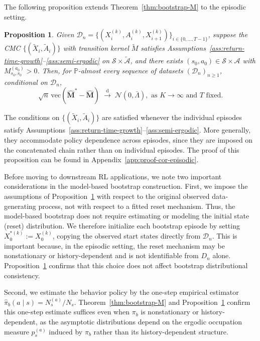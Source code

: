 \documentclass{article}
\numberwithin{equation}{section}
\newtheorem{proposition}[lemma]{Proposition}
\begin{document}
The following proposition extends Theorem~\ref{thm:bootstrap-M} to the episodic setting.
\begin{proposition}
\label{prop:bootstrap-M-episodic}
Given $\mathcal{D}_n = \bigl\{(X^{(k)}_i, A^{(k)}_i, X^{(k)}_{i+1})\bigr\}_{i \in \{0,\dots,T-1\} }$, suppose the CMC $\{(\widetilde{X}_i,\widetilde{A}_i)\}$ with transition kernel $\widetilde{M}$ satisfies Assumptions~\ref{ass:return-time-growth}--\ref{ass:semi-ergodic} on $\mathcal{S}\times\widetilde{\mathcal{A}}$, and there exists $(s_0,a_0)\in\mathcal{S}\times \mathcal{A}$ with $M_{s_0,s_0}^{(a_0)}>0$.
Then, for $\mathbb{P}$-almost every sequence of datasets $(\mathcal{D}_n)_{n\ge 1}$, conditional on $\mathcal{D}_n$, 
\[
\sqrt{n}\,\mathrm{vec}(\hat{\mathbf{M}}^\ast - \hat{\mathbf{M}})
\;\xrightarrow{\mathrm{d}}\;
\mathcal{N}(0,\bar\Lambda), \text{ as $K\to\infty$ and $T$ fixed}.
\]
\end{proposition}
The conditions on $\{(\widetilde X_i,\widetilde A_i)\}$ are satisfied whenever the individual episodes satisfy Assumptions~\ref{ass:return-time-growth}--\ref{ass:semi-ergodic}.
More generally, they accommodate policy dependence across episodes, since they are imposed on the concatenated chain rather than on individual episodes.
The proof of this proposition can be found in Appendix~\ref{app:proof-cor-episodic}.

Before moving to downstream RL applications, we note two important considerations in the model-based bootstrap construction. First, we impose the assumptions of Proposition~\ref{prop:bootstrap-M-episodic} with respect to the original observed data-generating process, not with respect to a fitted reset mechanism. 
Thus, the model-based bootstrap does not require estimating or modeling the initial state (reset) distribution. 
We therefore initialize each bootstrap episode by setting $X_0^{\ast(k)} := X_0^{(k)}$, copying the observed start states directly from $\mathcal{D}_n$. 
This is important because, in the episodic setting, the reset mechanism may be nonstationary or history-dependent and is not identifiable from $D_n$ alone. 
Proposition~\ref{prop:bootstrap-M-episodic} confirms that this choice does not affect bootstrap distributional consistency.

Second, we estimate the behavior policy by the one-step empirical estimator $\hat\pi_b(a\mid s) = N_s^{(a)}/N_s$. 
Theorem~\ref{thm:bootstrap-M} and Proposition~\ref{prop:bootstrap-M-episodic} confirm this one-step estimate suffices even when $\pi_b$ is nonstationary or history-dependent, as the asymptotic distributions depend on the ergodic occupation measure $p_s^{(a)}$ induced by $\pi_b$ rather than its history-dependent structure.
\end{document}

